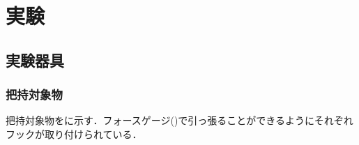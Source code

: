 \section{実験}
\subsection{実験器具}
\subsubsection{把持対象物}
把持対象物をに示す．フォースゲージ()で引っ張ることができるようにそれぞれフックが取り付けられている．

\begin{figure}[h]
\centering
{}
\hspace{7mm}
\\

\end{figure}
